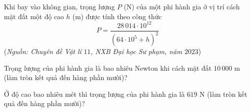 \begin{bt}%
	Khi bay vào không gian, trọng lượng $P$ (N) của một phi hành gia ở vị trí cách mặt đất một độ cao $h$ (m) được tính theo công thức
	$$
	P=\dfrac{28\, 014 \cdot 10^{12}}{\left(64 \cdot 10^5+h\right)^2}
	$$
	(\textit{Nguồn: Chuyên đề Vật lí $11$, NXB Đại học Sư phạm, năm $2023$})
	\begin{listEX}
	\item Trọng lượng của phi hành gia là bao nhiêu Newton khi cách mặt đất $10\, 000 $ m (làm tròn kết quả đến hàng phần mười)?
	\item Ở độ cao bao nhiêu mét thì trọng lượng của phi hành gia là $619$ N (làm tròn kết quả đến hàng phần mười)?
	\end{listEX}
\end{bt}
